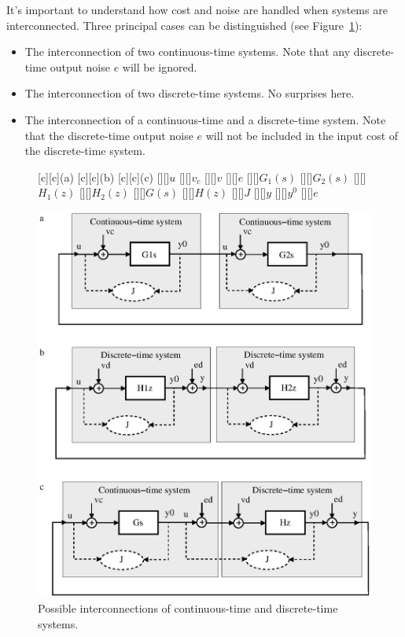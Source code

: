 \documentclass[final,twoside]{rapport}  %
\begin{document}
It's important to understand how cost and noise are handled when
systems are interconnected. Three principal cases can be distinguished
(see Figure~\ref{fig:connecting}):
\begin{itemize}
\item[(a)] The interconnection of two continuous-time systems. Note that any discrete-time
  output noise $e$ will be ignored. 
\item[(b)] The interconnection of two discrete-time systems. No
  surprises here.
\item[(c)] The interconnection of a continuous-time  and a
  discrete-time system. Note that 
  the discrete-time output noise $e$ will not be included in
  the input cost of the discrete-time system.
\end{itemize}

\begin{figure}[tbp]
  [c][c]{\small (a)}
  [c][c]{\small (b)}
  [c][c]{\small (c)}
  [][]{$u$}
  [][]{$v_c$}
  [][]{$v$}
  [][]{$e$}
  [][]{$G_1(s)$}
  [][]{$G_2(s)$}
  [][]{$H_1(z)$}
  [][]{$H_2(z)$}
  [][]{$G(s)$}
  [][]{$H(z)$}
  [][]{$J$}
  [][]{$y$}
  [][]{$y^0$}
  [][]{$e$}
  \centerline{\includegraphics[width=0.9\hsize]{connecting.eps}}
  \caption{Possible interconnections of continuous-time and
    discrete-time systems.}
  \label{fig:connecting}
\end{figure}
\end{document}
